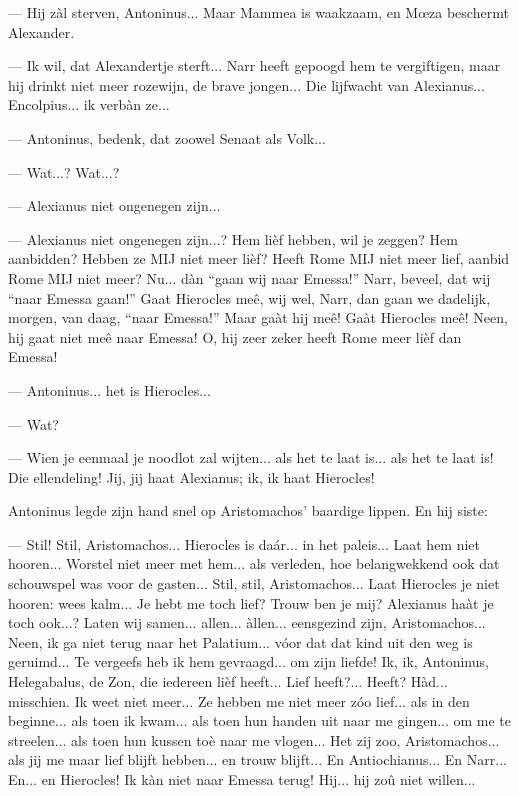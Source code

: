 \documentclass[a4paper, 12pt, oneside, dutch]{article}
\begin{document}
--- Hij zàl sterven, Antoninus... Maar Mammea is waakzaam, en Mœza beschermt Alexander.

--- Ik wil, dat Alexandertje sterft... Narr heeft gepoogd hem te vergiftigen, maar hij drinkt niet meer rozewijn, de brave jongen... Die lijfwacht van Alexianus... Encolpius... ik verbàn ze...

--- Antoninus, bedenk, dat zoowel Senaat als Volk...

--- Wat...? Wat...?

--- Alexianus niet ongenegen zijn...

--- Alexianus niet ongenegen zijn...? Hem lièf hebben, wil je zeggen? Hem aanbidden? Hebben ze MIJ niet meer lièf? Heeft Rome MIJ niet meer lief, aanbid Rome MIJ niet meer? Nu... dàn "`gaan wij naar Emessa!"' Narr, beveel, dat wij "`naar Emessa gaan!"' Gaat Hierocles meê, wij wel, Narr, dan gaan we dadelijk, morgen, van daag, "`naar Emessa!"' Maar gaàt hij meê! Gaàt Hierocles meê! Neen, hij gaat niet meê naar Emessa! O, hij zeer zeker heeft Rome meer lièf dan Emessa!

--- Antoninus... het is Hierocles...

--- Wat?

--- Wien je eenmaal je noodlot zal wijten... als het te laat is... als het te laat is! Die ellendeling! Jij, jij haat Alexianus; ik, ik haat Hierocles!

Antoninus legde zijn hand snel op Aristomachos' baardige lippen. En hij siste:

--- Stil! Stil, Aristomachos... Hierocles is daár... in het paleis... Laat hem niet hooren... Worstel niet meer met hem... als verleden, hoe belangwekkend ook dat schouwspel was voor de gasten... Stil, stil, Aristomachos... Laat Hierocles je niet hooren: wees kalm... Je hebt me toch lief? Trouw ben je mij? Alexianus haàt je toch ook...? Laten wij samen... allen... àllen... eensgezind zijn, Aristomachos... Neen, ik ga niet terug naar het Palatium... vóor dat dat kind uit den weg is geruimd... Te vergeefs heb ik hem gevraagd... om zijn liefde! Ik, ik, Antoninus, Helegabalus, de Zon, die iedereen lièf heeft... Lief heeft?... Heeft? Hàd... misschien. Ik weet niet meer... Ze hebben me niet meer zóo lief... als in den beginne... als toen ik kwam... als toen hun handen uit naar me gingen... om me te streelen... als toen hun kussen toè naar me vlogen... Het zij zoo, Aristomachos... als jij me maar lief blijft hebben... en trouw blijft... En Antiochianus... En Narr... En... en Hierocles! Ik kàn niet naar Emessa terug! Hij... hij zoû niet willen...
\end{document}
